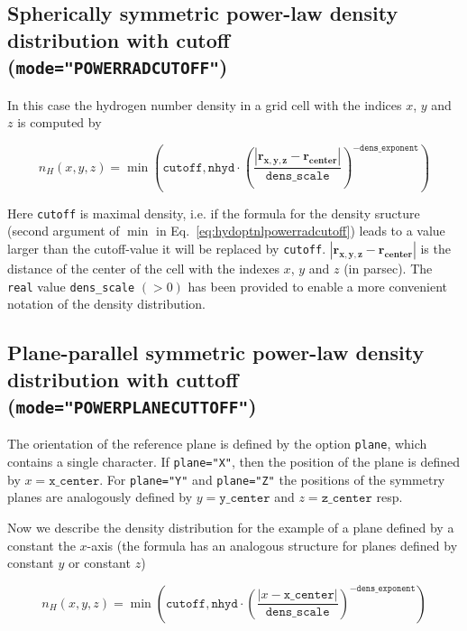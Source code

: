 \documentclass[a4paper,10pt]{article}
\begin{document}
\begin{appendix}
\subsection{Spherically symmetric power-law density distribution with cutoff\\ 
(\texttt{mode="POWERRADCUTOFF"})}
In this case the hydrogen number density in a grid cell with the indices $x$, 
$y$ and $z$ is computed by

\begin{equation}
 n_H(x,y,z) = \min \left(\mathtt{cutoff}, 
\mathtt{nhyd} \cdot \left(
 \frac{\left|\mathbf{r_{x,y,z}} - 
\mathbf{r_{center}} \right|}{\mathtt{dens\_scale}}
\right)^{- \mathtt{dens\_exponent}}\right)
\label{eq:hydoptnlpowerradcutoff}
\end{equation}

Here \texttt{cutoff} is maximal density, i.e. if the formula for the density
sructure (second argument of $\min$ in Eq.~\ref{eq:hydoptnlpowerradcutoff}) 
leads to a  value larger than the cutoff-value it will be replaced by 
\texttt{cutoff}.  
$\left|\mathbf{r_{x,y,z}} - \mathbf{r_{center}} \right|$ is the
distance of the center of the cell with the indexes $x$, $y$ and $z$ (in 
parsec). The \texttt{real} value \texttt{dens\_scale} $(>0)$ has been provided 
to enable a more convenient notation of the density distribution.


\subsection{Plane-parallel symmetric power-law density distribution with 
cuttoff\\ (\texttt{mode="POWERPLANECUTTOFF"})}

The orientation of the reference plane is defined by the option \texttt{plane}, 
which contains a single character. If \texttt{plane="X"}, then the 
position of the plane is defined by $x=\mathtt{x\_center}$. For 
\texttt{plane="Y"} and 
\texttt{plane="Z"} the positions of the symmetry planes are analogously 
defined by  $y=\mathtt{y\_center}$  and  $z=\mathtt{z\_center}$ resp.

Now we describe the density distribution for the example of a plane defined by 
a constant the $x$-axis (the formula has an analogous structure for planes 
defined by constant $y$ or constant $z$)

\begin{equation}
 n_H(x,y,z) = \min \left(\mathtt{cutoff}, 
 \mathtt{nhyd} \cdot \left(
 \frac{\left|x - 
 \texttt{x\_center} \right|}{\mathtt{dens\_scale}}
\right)^{- \mathtt{dens\_exponent}}\right)
\label{eq:hydoptnlpowerplanecutoff}
\end{equation}




\end{appendix}
\end{document}
